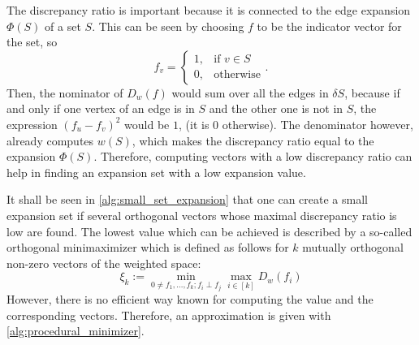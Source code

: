 The discrepancy ratio is important because it is connected to the edge expansion $\Phi(S)$ of a set $S$. This can be seen by choosing $f$ to be the indicator vector for the set, so \begin{equation}
	f_v=\begin{cases}
	1, & \text{if } v\in S\\
	0, & \text{otherwise}
	\end{cases}.
\end{equation} Then, the nominator of $D_w(f)$ would sum over all the edges in $\delta S$, because if and only if one vertex of an edge is in $S$ and the other one is not in $S$, the expression $(f_u - f_v)^2 $ would be $1$, (it is $0$ otherwise). The denominator however, already computes $w(S)$, which makes the discrepancy ratio equal to the expansion $\Phi(S)$. Therefore, computing vectors with a low discrepancy ratio can help in finding an expansion set with a low expansion value.


It shall be seen in \cref{alg:small_set_expansion} that one can create a small expansion set if several orthogonal vectors whose maximal discrepancy ratio is low are found. The lowest value which can be achieved is described by a so-called orthogonal minimaximizer which is defined as follows for $k$ mutually orthogonal non-zero vectors of the weighted space:
\begin{equation}\label{eq:xi}
\xi_k := \min_{0 \neq f_1, \ldots , f_k ; f_i \perp f_j } \max_{i \in [k]} D_w(f_i)
\end{equation}
However, there is no efficient way known for computing the value and the corresponding vectors. Therefore, an approximation is given with \cref{alg:procedural_minimizer}.






